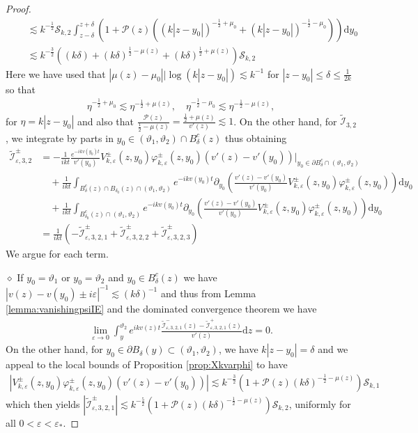 \documentclass[10pt,a4paper]{amsart}
\newcommand\cI{{\mathcal I}}
\newcommand\cS{{\mathcal S}}
\newcommand{\diampar}[1]{\vspace{.5em}\noindent $\diamond$ \normalfont {\itshape #1.}}
\newcommand{\ep}{\varepsilon}
\renewcommand{\P}{{\mathcal{P}}}
\renewcommand{\d}{\mathrm{d}}
\begin{document}
\begin{proof}
\begin{align*}
&\quad\lesssim k^{-\frac12}\cS_{k,2}\int_{z-\delta}^{z+\delta} \left( 1  + \P(z) \left( (k|z-y_0|) ^{-\frac12+\mu_0} + (k|z-y_0|) ^{-\frac12-\mu_0} \right) \right) \d y_0 \\
&\quad\lesssim k^{-\frac32}\left( (k\delta) +  (k\delta)^{\frac12-\mu(z)} +  (k\delta)^{\frac12+\mu(z)} \right) \cS_{k,2}
\end{align*}
Here we have used that $|\mu(z) - \mu_0||\log(k|z-y_0|) \lesssim k^{-1}$ for $|z-y_0|\leq \delta \leq\frac{1}{2k}$ so that
\begin{align*}
\eta^{-\frac12+\mu_0} \lesssim \eta^{-\frac12+\mu(z)}, \quad \eta^{-\frac12-\mu_0} \lesssim \eta^{-\frac12-\mu(z)}, 
\end{align*}
for $\eta=k|z-y_0|$ and also that $\frac{\P(z)}{\frac12-\mu(z)}= \frac{\frac12+\mu(z)}{v'(z)}\lesssim 1$. On the other hand, for $\widetilde\cI_{3,2}$, we integrate by parts in $y_0\in (\vartheta_1,\vartheta_2)\cap B_\delta^c(z)$ thus obtaining
\begin{align*}
\widetilde\cI_{\ep,3,2}^\pm &= -\frac{1}{ikt}\frac{e^{-ikv(y_0)t}}{v'(y_0)} V_{k,\ep}^\pm(z,y_0) \varphi_{k,\ep}^\pm(z,y_0)(v'(z) - v'(y_0)) \Big|_{y_0\in \partial B_\delta^c\cap(\vartheta_1,\vartheta_2)} \\
&\quad + \frac{1}{ikt}\int_{B_{\delta}^c(z)\cap B_{\delta_0}(z)\cap(\vartheta_1,\vartheta_2)}e^{-ikv(y_0)t}\partial_{y_0} \left( \frac{v'(z) - v'(y_0)}{v'(y_0)}V_{k,\ep}^\pm(z,y_0) \varphi_{k,\ep}^\pm(z,y_0) \right)  \d y_0 \\
&\quad + \frac{1}{ikt}\int_{B_{\delta_0}^c(z)\cap(\vartheta_1,\vartheta_2)}e^{-ikv(y_0)t}\partial_{y_0} \left( \frac{v'(z) - v'(y_0)}{v'(y_0)}V_{k,\ep}^\pm(z,y_0) \varphi_{k,\ep}^\pm(z,y_0) \right)  \d y_0 \\
&=  \frac{1}{ikt} \left( -\widetilde\cI_{\ep,3,2,1}^\pm + \widetilde\cI_{\ep,3,2,2}^\pm + \widetilde\cI_{\ep,3,2,3}^\pm  \right)
\end{align*}
We argue for each term.

\diampar{Estimates for $\widetilde\cI_{\ep,3,2,1}^\pm$} If $y_0=\vartheta_1$ or $y_0=\vartheta_2$ and  $y_0\in B_\delta^c(z)$ we have $|v(z) - v(y_0)\pm i\ep|^{-1}\lesssim (k\delta)^{-1}$ and thus from Lemma \ref{lemma:vanishingpsiIE} and the dominated convergence theorem we have
\begin{align*}
\lim_{\ep\rightarrow 0} \int_y^{\vartheta_2} e^{ikv(z) t} \frac{\widetilde\cI_{\ep,3,2,1}^-(z) - \widetilde\cI_{\ep,3,2,1}^+(z)}{v'(z)} \d z =0.
\end{align*}
On the other hand, for $y_0\in \partial B_{\delta}(y)\subset  (\vartheta_1,\vartheta_2)$, we have $k|z-y_0|=\delta$ and we appeal to the local bounds of Proposition \ref{prop:Xkvarphi} to have
\begin{align*}
\left| V_{k,\ep}^\pm(z,y_0)\varphi_{k,\ep}^\pm(z,y_0) (v'(z) - v'(y_0)) \right| \lesssim k^{-\frac32}\left( 1 + \P(z) (k\delta)^{-\frac12-\mu(z)} \right) \cS_{k,1}
\end{align*}
which then yields $|\widetilde\cI_{\ep,3,2,1}^\pm | \lesssim k^{-\frac52}\left( 1 + \P(z) (k\delta)^{-\frac12-\mu(z)} \right) \cS_{k,2}$, uniformly for all $0< \ep< \ep_*$.


\end{proof}
\end{document}
